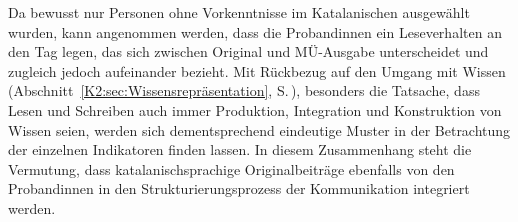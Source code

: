 Da bewusst nur Personen ohne Vorkenntnisse im Katalanischen ausgewählt wurden, kann angenommen werden, dass die Proband{\textperiodcentered}innen ein Leseverhalten an den Tag legen, das sich zwischen Original und MÜ-Ausgabe unterscheidet und zugleich jedoch aufeinander bezieht. Mit Rückbezug auf den Umgang mit Wissen (Abschnitt~\ref{K2:sec:Wissensrepräsentation}, S.\,\pageref{K2:sec:Wissensrepräsentation}), besonders die Tatsache, dass Lesen und Schreiben auch immer Produktion, Integration und Konstruktion von Wissen seien, werden sich dementsprechend eindeutige Muster in der Betrachtung der einzelnen Indikatoren finden lassen. In diesem Zusammenhang steht die Vermutung, dass katalanischsprachige Originalbeiträge ebenfalls von den Proband{\textperiodcentered}innen in den Strukturierungsprozess der Kommunikation integriert werden.
